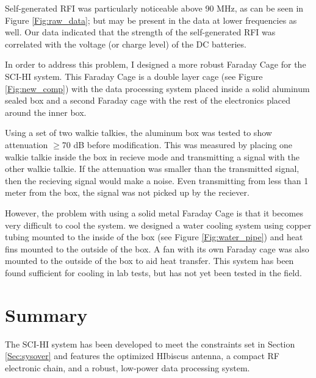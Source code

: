 Self-generated RFI was particularly noticeable above 90 MHz, as can be seen in Figure \ref{Fig:raw_data}; but may be present in the data at lower frequencies as well. Our data indicated that the strength of the self-generated RFI was correlated with the voltage (or charge level) of the DC batteries. 

In order to address this problem, I designed a more robust Faraday Cage for the SCI-HI system. This Faraday Cage is a double layer cage (see Figure \ref{Fig:new_comp}) with the data processing system placed inside a solid aluminum sealed box and a second Faraday cage with the rest of the electronics placed around the inner box. 

Using a set of two walkie talkies, the aluminum box was tested to show attenuation $\geq$70 dB before modification. This was measured by placing one walkie talkie inside the box in recieve mode and transmitting a signal with the other walkie talkie. If the attenuation was smaller than the transmitted signal, then the recieving signal would make a noise. Even transmitting from less than 1 meter from the box, the signal was not picked up by the reciever. 

However, the problem with using a solid metal Faraday Cage is that it becomes very difficult to cool the system. we designed a water cooling system using copper tubing mounted to the inside of the box (see Figure \ref{Fig:water_pipe}) and heat fins mounted to the outside of the box. A fan with its own Faraday cage was also mounted to the outside of the box to aid heat transfer. This system has been found sufficient for cooling in lab tests, but has not yet been tested in the field. 

\section{Summary}

The SCI-HI system has been developed to meet the constraints set in Section \ref{Sec:sysover} and features the optimized HIbiscus antenna, a compact RF electronic chain, and a robust, low-power data processing system. 
